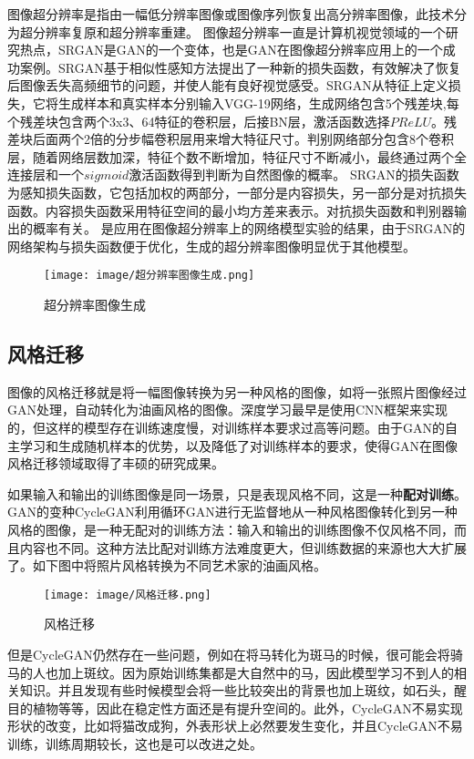 \documentclass[lang=cn,a4paper,12pt,bibend=biber]{GAN}
\begin{document}
图像超分辨率是指由一幅低分辨率图像或图像序列恢复出高分辨率图像，此技术分为超分辨率复原和超分辨率重建。
图像超分辨率一直是计算机视觉领域的一个研究热点，SRGAN是GAN的一个变体，也是GAN在图像超分辨率应用上的一个成功案例。SRGAN基于相似性感知方法提出了一种新的损失函数，有效解决了恢复后图像丢失高频细节的问题，并使人能有良好视觉感受。SRGAN从特征上定义损失，它将生成样本和真实样本分别输入VGG-19网络，生成网络包含5个残差块,每个残差块包含两个3x3、64特征的卷积层，后接BN层，激活函数选择$PReLU$。残差块后面两个2倍的分步幅卷积层用来增大特征尺寸。判别网络部分包含8个卷积层，随着网络层数加深，特征个数不断增加，特征尺寸不断减小，最终通过两个全连接层和一个$sigmoid$激活函数得到判断为自然图像的概率。
SRGAN的损失函数为感知损失函数，它包括加权的两部分，一部分是内容损失，另一部分是对抗损失函数。内容损失函数采用特征空间的最小均方差来表示。对抗损失函数和判别器输出的概率有关。
是应用在图像超分辨率上的网络模型实验的结果，由于SRGAN的网络架构与损失函数便于优化，生成的超分辨率图像明显优于其他模型。

\begin{figure}[!htbp]
  \centering
  \texttt{[image: image/超分辨率图像生成.png]}
  \caption[]{超分辨率图像生成}
  \label{fig:超分辨率图像生成}
\end{figure}

\subsection{风格迁移}

图像的风格迁移就是将一幅图像转换为另一种风格的图像，如将一张照片图像经过GAN处理，自动转化为油画风格的图像。深度学习最早是使用CNN框架来实现的，但这样的模型存在训练速度慢，对训练样本要求过高等问题。由于GAN的自主学习和生成随机样本的优势，以及降低了对训练样本的要求，使得GAN在图像风格迁移领域取得了丰硕的研究成果。

如果输入和输出的训练图像是同一场景，只是表现风格不同，这是一种\textbf{配对训练}。GAN的变种CycleGAN利用循环GAN进行无监督地从一种风格图像转化到另一种风格的图像，是一种无配对的训练方法：输入和输出的训练图像不仅风格不同，而且内容也不同。这种方法比配对训练方法难度更大，但训练数据的来源也大大扩展了。如下图中将照片风格转换为不同艺术家的油画风格。

\begin{figure}[!htbp]
  \centering
  \texttt{[image: image/风格迁移.png]}
  \caption[]{风格迁移}
  \label{fig:风格迁移}
\end{figure}

但是CycleGAN仍然存在一些问题，例如在将马转化为斑马的时候，很可能会将骑马的人也加上斑纹。因为原始训练集都是大自然中的马，因此模型学习不到人的相关知识。并且发现有些时候模型会将一些比较突出的背景也加上斑纹，如石头，醒目的植物等等，因此在稳定性方面还是有提升空间的。此外，CycleGAN不易实现形状的改变，比如将猫改成狗，外表形状上必然要发生变化，并且CycleGAN不易训练，训练周期较长，这也是可以改进之处。
\end{document}
